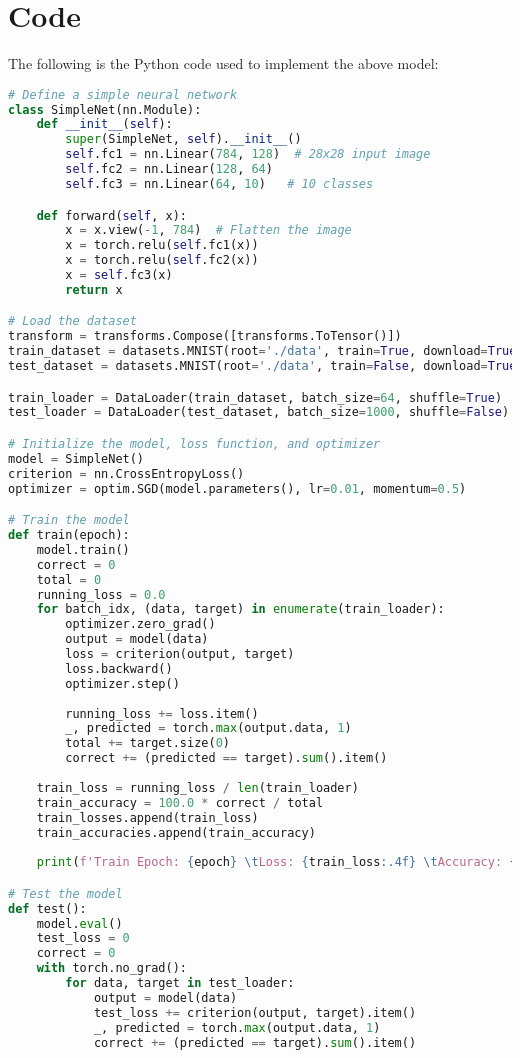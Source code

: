 \documentclass{article}
\begin{document}
\section{Code}
The following is the Python code used to implement the above model:
\begin{lstlisting}[language=Python, basicstyle=\ttfamily\small, breaklines=true]
# Define a simple neural network
class SimpleNet(nn.Module):
    def __init__(self):
        super(SimpleNet, self).__init__()
        self.fc1 = nn.Linear(784, 128)  # 28x28 input image
        self.fc2 = nn.Linear(128, 64)
        self.fc3 = nn.Linear(64, 10)   # 10 classes

    def forward(self, x):
        x = x.view(-1, 784)  # Flatten the image
        x = torch.relu(self.fc1(x))
        x = torch.relu(self.fc2(x))
        x = self.fc3(x)
        return x

# Load the dataset
transform = transforms.Compose([transforms.ToTensor()])
train_dataset = datasets.MNIST(root='./data', train=True, download=True, transform=transform)
test_dataset = datasets.MNIST(root='./data', train=False, download=True, transform=transform)

train_loader = DataLoader(train_dataset, batch_size=64, shuffle=True)
test_loader = DataLoader(test_dataset, batch_size=1000, shuffle=False)

# Initialize the model, loss function, and optimizer
model = SimpleNet()
criterion = nn.CrossEntropyLoss()
optimizer = optim.SGD(model.parameters(), lr=0.01, momentum=0.5)

# Train the model
def train(epoch):
    model.train()
    correct = 0
    total = 0
    running_loss = 0.0
    for batch_idx, (data, target) in enumerate(train_loader):
        optimizer.zero_grad()
        output = model(data)
        loss = criterion(output, target)
        loss.backward()
        optimizer.step()
        
        running_loss += loss.item()
        _, predicted = torch.max(output.data, 1)
        total += target.size(0)
        correct += (predicted == target).sum().item()
    
    train_loss = running_loss / len(train_loader)
    train_accuracy = 100.0 * correct / total
    train_losses.append(train_loss)
    train_accuracies.append(train_accuracy)
    
    print(f'Train Epoch: {epoch} \tLoss: {train_loss:.4f} \tAccuracy: {train_accuracy:.2f}%')

# Test the model
def test():
    model.eval()
    test_loss = 0
    correct = 0
    with torch.no_grad():
        for data, target in test_loader:
            output = model(data)
            test_loss += criterion(output, target).item()
            _, predicted = torch.max(output.data, 1)
            correct += (predicted == target).sum().item()
    

\end{lstlisting}
\end{document}
